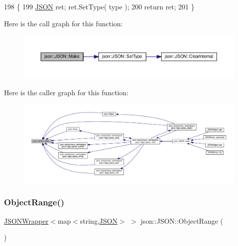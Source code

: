 \begin{DoxyCode}
198                                        \{
199             \mbox{\hyperlink{class_j_s_o_n}{JSON}} ret; ret.SetType( type );
200             \textcolor{keywordflow}{return} ret;
201         \}
\end{DoxyCode}
Here is the call graph for this function\+:
\nopagebreak
\begin{figure}[H]
\begin{center}
\leavevmode
\includegraphics[width=350pt]{classjson_1_1_j_s_o_n_aa679dc348ed9711357c315a461b65957_cgraph}
\end{center}
\end{figure}
Here is the caller graph for this function\+:
\nopagebreak
\begin{figure}[H]
\begin{center}
\leavevmode
\includegraphics[width=350pt]{classjson_1_1_j_s_o_n_aa679dc348ed9711357c315a461b65957_icgraph}
\end{center}
\end{figure}
\mbox{\label{classjson_1_1_j_s_o_n_a5e2527751cd1ae28b29e82fd1de15555}} 
\subsubsection{\texorpdfstring{Object\+Range()}{ObjectRange()}\hspace{0.1cm}{\footnotesize\ttfamily [1/2]}}
{\footnotesize\ttfamily \mbox{\hyperlink{classjson_1_1_j_s_o_n_1_1_j_s_o_n_wrapper}{J\+S\+O\+N\+Wrapper}}$<$map$<$string,\mbox{\hyperlink{classjson_1_1_j_s_o_n}{J\+S\+ON}}$>$ $>$ json\+::\+J\+S\+O\+N\+::\+Object\+Range (\begin{DoxyParamCaption}{ }\end{DoxyParamCaption})\hspace{0.3cm}{\ttfamily [inline]}}



